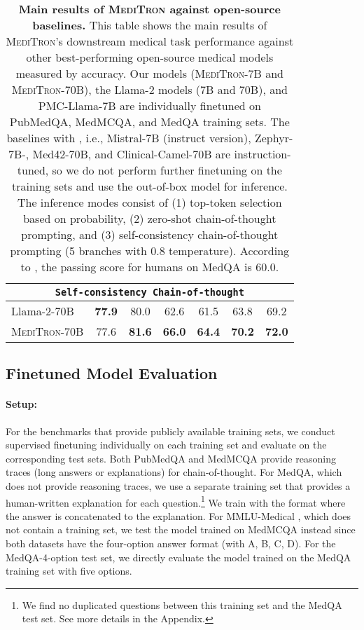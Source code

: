 \documentclass{article}
\newcommand{\llama}{\textnormal{Llama}}
\newcommand{\mtron}{\textsc{MediTron}\xspace}
\newcommand{\mtrona}{\textsc{MediTron-7B}\xspace}
\newcommand{\mtronb}{\textsc{MediTron-70B}\xspace}
\begin{document}
\begin{table}[t]
{\begin{tabular}{lcccccc}
        \multicolumn{7}{c}{\texttt{Self-consistency Chain-of-thought}} \\ \midrule
        \llama-2-70B   & \textbf{77.9} & 80.0 & 62.6 & 61.5 & 63.8 & 69.2 \\
        \mtronb & 77.6 & \textbf{81.6} & \textbf{66.0} & \textbf{64.4} & \textbf{70.2} & \textbf{72.0} \\
        \bottomrule
    \end{tabular}
    }
    \caption{\textbf{Main results of \mtron against open-source baselines.} This table shows the main results of \mtron's downstream medical task performance against other best-performing open-source medical models measured by accuracy. Our models (\mtrona and \mtronb), the \llama-2 models (7B and 70B), and PMC-\llama-7B are individually finetuned on PubMedQA, MedMCQA, and MedQA training sets. The baselines with , i.e., Mistral-7B (instruct version), Zephyr-7B-, Med42-70B, and Clinical-Camel-70B are instruction-tuned, so we do not perform further finetuning on the training sets and use the out-of-box model for inference. The inference modes consist of (1) top-token selection based on probability,  (2) zero-shot chain-of-thought prompting, and (3) self-consistency chain-of-thought prompting (5 branches with 0.8 temperature). According to \citet{tian2023opportunities}, the passing score for humans on MedQA is 60.0.} 
    \label{tab:main_results}
    \vspace{-5mm}
\end{table}

\subsection{Finetuned Model Evaluation} \label{sssec:finetune}
\paragraph{Setup:} For the benchmarks that provide publicly available training sets, we conduct supervised finetuning individually on each training set and evaluate on the corresponding test sets. Both PubMedQA and MedMCQA provide reasoning traces (long answers or explanations) for chain-of-thought. For MedQA, which does not provide reasoning traces, we use a separate training set that provides a human-written explanation for each question.\footnote{We find no duplicated questions between this training set and the MedQA test set. See more details in the Appendix.} We train with the format where the answer is concatenated to the explanation. For MMLU-Medical \citep{mmlu}, which does not contain a training set, we test the model trained on MedMCQA instead since both datasets have the four-option answer format (with A, B, C, D). For the MedQA-4-option test set, we directly evaluate the model trained on the MedQA training set with five options. 
\end{document}
